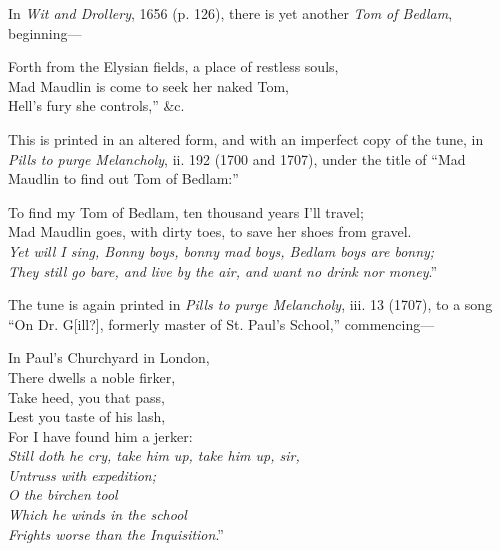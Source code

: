 In \textit{Wit and Drollery}, 1656 (p. 126), there is yet another \textit{Tom of Bedlam},
beginning—
\settowidth{\versewidth}{Forth from the Elysian fields, a place of restless souls,}
\begin{scverse}Forth from the Elysian fields, a place of restless souls,\\
\vin Mad Maudlin is come to seek her naked Tom,\\
Hell’s fury she controls,” \&c.
\end{scverse}
This is printed in an altered form, and with an imperfect copy of the tune, in \textit{
Pills to purge Melancholy}, ii. 192 (1700 and 1707), under the title of “Mad
Maudlin to find out Tom of Bedlam:”
\settowidth{\versewidth}{To find my Tom of Bedlam, ten thousand years I’ll travel;}
\begin{scverse}
To find my Tom of Bedlam, ten thousand years I’ll travel;\\
Mad Maudlin goes, with dirty toes, to save her shoes from gravel.\\
\textit{Yet will I sing, Bonny boys, bonny mad boys, Bedlam boys are bonny;\\
They still go bare, and live by the air, and want no drink nor money}.”
\end{scverse}

The tune is again printed in \textit{ Pills to purge Melancholy}, iii. 13 (1707), to a song
“On Dr. G[ill?], formerly master of St. Paul’s School,” commencing—
\settowidth{\versewidth}{In Paul’s Churchyard in London,xxxx}
\begin{scverse}
\begin{patverse}
In Paul’s Churchyard in London,\\
There dwells a noble firker,\\
Take heed, you that pass,\\
Lest you taste of his lash,\\
For I have found him a jerker:\\
\textit{Still doth he cry, take him up, take him up, sir,\\
Untruss with expedition;\\
O the birchen tool\\
Which he winds in the school\\
Frights worse than the Inquisition}.”
\end{patverse}
\end{scverse}

